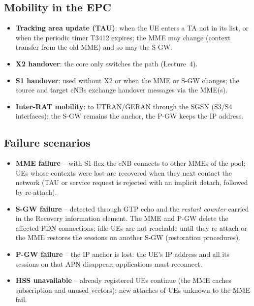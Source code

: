 \documentclass[11pt,a4paper]{article}
\begin{document}
\subsection{Mobility in the EPC}
\begin{itemize}
  \item \textbf{Tracking area update (TAU)}: when the UE enters a TA not in its list, or when the
        periodic timer T3412 expires; the MME may change (context transfer from the old MME) and so may
        the S-GW.
  \item \textbf{X2 handover}: the core only switches the path (Lecture~4).
  \item \textbf{S1 handover}: used without X2 or when the MME or S-GW changes; the source and target
        eNBs exchange handover messages via the MME(s).
  \item \textbf{Inter-RAT mobility}: to UTRAN/GERAN through the SGSN (S3/S4 interfaces); the S-GW
        remains the anchor, the P-GW keeps the IP address.
\end{itemize}

\subsection{Failure scenarios}
\begin{itemize}
  \item \textbf{MME failure} -- with S1-flex the eNB connects to other MMEs of the pool; UEs whose
        contexts were lost are recovered when they next contact the network (TAU or service request is
        rejected with an implicit detach, followed by re-attach).
  \item \textbf{S-GW failure} -- detected through GTP echo and the \emph{restart counter} carried in the
        Recovery information element. The MME and P-GW delete the affected PDN connections; idle UEs are
        not reachable until they re-attach or the MME restores the sessions on another S-GW (restoration
        procedures).
  \item \textbf{P-GW failure} -- the IP anchor is lost: the UE's IP address and all its sessions on that
        APN disappear; applications must reconnect.
  \item \textbf{HSS unavailable} -- already registered UEs continue (the MME caches subscription and
        unused vectors); new attaches of UEs unknown to the MME fail.
\end{itemize}

\end{document}
